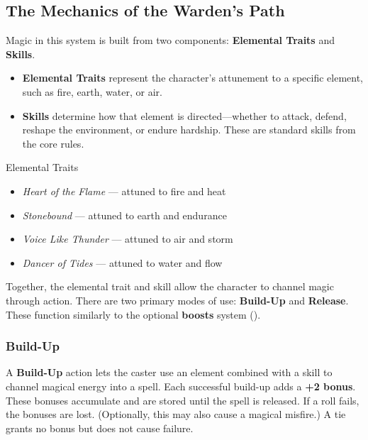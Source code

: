 \subsection{The Mechanics of the Warden’s Path}

Magic in this system is built from two components: \textbf{Elemental Traits} and \textbf{Skills}.

\begin{itemize}\raggedright
    \item \textbf{Elemental Traits} represent the character’s attunement to a specific element, such as fire, earth, water, or air.
    \item \textbf{Skills} determine how that element is directed—whether to attack, defend, reshape the environment, or endure hardship. These are standard skills from the core rules.
\end{itemize}

\begin{Example}{Elemental Traits}
    \begin{itemize}
        \item \textit{Heart of the Flame} — attuned to fire and heat  
        \item \textit{Stonebound} — attuned to earth and endurance  
        \item \textit{Voice Like Thunder} — attuned to air and storm  
        \item \textit{Dancer of Tides} — attuned to water and flow  
    \end{itemize}
\end{Example}

Together, the elemental trait and skill allow the character to channel magic through action. There are two primary modes of use: \textbf{Build-Up} and \textbf{Release}. These function similarly to the optional \textbf{boosts} system ().

\subsubsection{Build-Up}

A \textbf{Build-Up} action lets the caster use an element combined with a skill to channel magical energy into a spell. Each successful build-up adds a \textbf{+2 bonus}. These bonuses accumulate and are stored until the spell is released. If a roll fails, the bonuses are lost. (Optionally, this may also cause a magical misfire.) A tie grants no bonus but does not cause failure.

